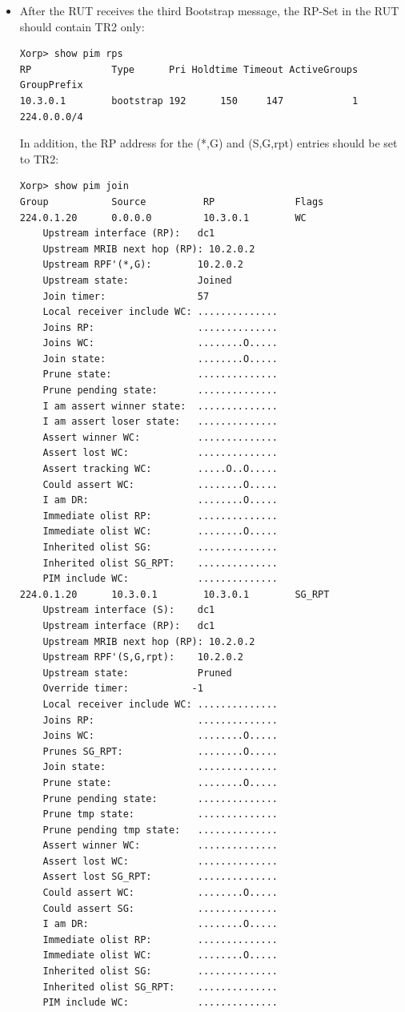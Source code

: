 \documentclass[11pt]{report}
\begin{document}
\begin{itemize}
  \item After the RUT receives the third Bootstrap message, the RP-Set in the
  RUT should contain TR2 only:

\begin{verbatim}
Xorp> show pim rps 
RP              Type      Pri Holdtime Timeout ActiveGroups GroupPrefix       
10.3.0.1        bootstrap 192      150     147            1 224.0.0.0/4       
\end{verbatim}

  In addition, the RP address for the (*,G) and (S,G,rpt) entries should be
  set to TR2:

\begin{verbatim}
Xorp> show pim join 
Group           Source          RP              Flags
224.0.1.20      0.0.0.0         10.3.0.1        WC   
    Upstream interface (RP):   dc1
    Upstream MRIB next hop (RP): 10.2.0.2
    Upstream RPF'(*,G):        10.2.0.2
    Upstream state:            Joined 
    Join timer:                57
    Local receiver include WC: ..............
    Joins RP:                  ..............
    Joins WC:                  ........O.....
    Join state:                ........O.....
    Prune state:               ..............
    Prune pending state:       ..............
    I am assert winner state:  ..............
    I am assert loser state:   ..............
    Assert winner WC:          ..............
    Assert lost WC:            ..............
    Assert tracking WC:        .....O..O.....
    Could assert WC:           ........O.....
    I am DR:                   ........O.....
    Immediate olist RP:        ..............
    Immediate olist WC:        ........O.....
    Inherited olist SG:        ..............
    Inherited olist SG_RPT:    ..............
    PIM include WC:            ..............
224.0.1.20      10.3.0.1        10.3.0.1        SG_RPT 
    Upstream interface (S):    dc1
    Upstream interface (RP):   dc1
    Upstream MRIB next hop (RP): 10.2.0.2
    Upstream RPF'(S,G,rpt):    10.2.0.2
    Upstream state:            Pruned 
    Override timer:           -1
    Local receiver include WC: ..............
    Joins RP:                  ..............
    Joins WC:                  ........O.....
    Prunes SG_RPT:             ........O.....
    Join state:                ..............
    Prune state:               ........O.....
    Prune pending state:       ..............
    Prune tmp state:           ..............
    Prune pending tmp state:   ..............
    Assert winner WC:          ..............
    Assert lost WC:            ..............
    Assert lost SG_RPT:        ..............
    Could assert WC:           ........O.....
    Could assert SG:           ..............
    I am DR:                   ........O.....
    Immediate olist RP:        ..............
    Immediate olist WC:        ........O.....
    Inherited olist SG:        ..............
    Inherited olist SG_RPT:    ..............
    PIM include WC:            ..............
\end{verbatim}


\end{itemize}
\end{document}
